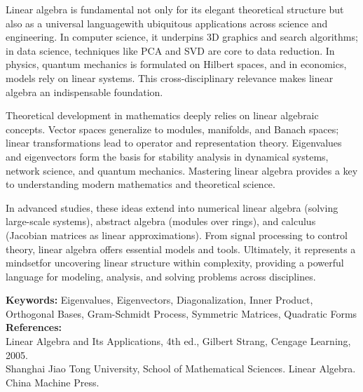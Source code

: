 Linear algebra is fundamental not only for its elegant theoretical structure but also as a universal languagewith ubiquitous applications across science and engineering. In computer science, it underpins 3D graphics and search algorithms; in data science, techniques like PCA and SVD are core to data reduction. In physics, quantum mechanics is formulated on Hilbert spaces, and in economics, models rely on linear systems. This cross-disciplinary relevance makes linear algebra an indispensable foundation.

Theoretical development in mathematics deeply relies on linear algebraic concepts. Vector spaces generalize to modules, manifolds, and Banach spaces; linear transformations lead to operator and representation theory. Eigenvalues and eigenvectors form the basis for stability analysis in dynamical systems, network science, and quantum mechanics. Mastering linear algebra provides a key to understanding modern mathematics and theoretical science.

In advanced studies, these ideas extend into numerical linear algebra (solving large-scale systems), abstract algebra (modules over rings), and calculus (Jacobian matrices as linear approximations). From signal processing to control theory, linear algebra offers essential models and tools. Ultimately, it represents a mindsetfor uncovering linear structure within complexity, providing a powerful language for modeling, analysis, and solving problems across disciplines.


\vspace{1cm}
\noindent
\textbf{Keywords:} Eigenvalues, Eigenvectors, Diagonalization, Inner Product, Orthogonal Bases, Gram-Schmidt Process, Symmetric Matrices, Quadratic Forms \\
\textbf{References:} \\
Linear Algebra and Its Applications, 4th ed., Gilbert Strang, Cengage Learning, 2005. \\
Shanghai Jiao Tong University, School of Mathematical Sciences. Linear Algebra. China Machine Press.

\cleardoublepage